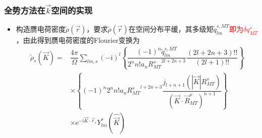 \frame
{
	\frametitle{全势方法在$\vec k$空间的实现}
\begin{itemize}
	\item 构造赝电荷密度$\tilde\rho(\vec r)$，要求$\tilde\rho(\vec r)$在空间分布平缓，其多级矩$\tilde q_{lm}^{s,MT}$\textcolor{red}{即为$\delta q_{MT}^s$}，由此得到赝电荷密度的\textrm{Flourier}变换为
	\begin{displaymath}
		\begin{aligned}
			\tilde\rho_s(\vec K)=&\dfrac{4\pi}{\Omega}\sum_{lm,s}(-\mathrm{i})^l\left\{\dfrac{(-1)^n\tilde q_{lm}^{s,MT}}{2^nn!a_n{R_{MT}^s}^{2l+2n+3}}\dfrac{(2l+2n+3)!!}{(2l+1)!!}\right\}\\
			&\times\left\{(-1)^n2^nn!a_n{R_{MT}^s}^{l+2n+3}\dfrac{j_{l+n+1}(|\vec K|R_{MT}^s)}{(\vec K\cdot\vec R_{MT}^s)^{n+1}}\right\}\\
			&\times\mathrm{e}^{\mathrm{-i}\vec K\cdot\vec r_s}Y_{lm}^{\ast}(\hat{\vec K})
		\end{aligned}
	\end{displaymath}
	\fontsize{6.5pt}{4.2pt}
\end{itemize}
}

